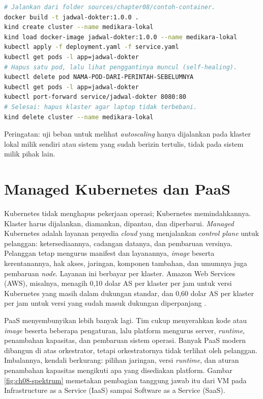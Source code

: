 \begin{pendalaman}[title={Pendalaman Teknis (opsional): Menjalankan Layanan di Klaster Lokal}]
\begin{lstlisting}[language=bash, caption={Menjalankan layanan jadwal dokter di klaster kind,
tersedia di \berkas{sources/chapter08/README.md}}, label={lst:ch08-perintah-kind}]
# Jalankan dari folder sources/chapter08/contoh-container.
docker build -t jadwal-dokter:1.0.0 .
kind create cluster --name medikara-lokal
kind load docker-image jadwal-dokter:1.0.0 --name medikara-lokal
kubectl apply -f deployment.yaml -f service.yaml
kubectl get pods -l app=jadwal-dokter
# Hapus satu pod, lalu lihat penggantinya muncul (self-healing).
kubectl delete pod NAMA-POD-DARI-PERINTAH-SEBELUMNYA
kubectl get pods -l app=jadwal-dokter
kubectl port-forward service/jadwal-dokter 8080:80
# Selesai: hapus klaster agar laptop tidak terbebani.
kind delete cluster --name medikara-lokal
\end{lstlisting}

  Peringatan: uji beban untuk melihat \textit{autoscaling} hanya dijalankan pada klaster lokal
  milik sendiri atau sistem yang sudah berizin tertulis, tidak pada sistem milik pihak lain.
\end{pendalaman}

\section{Managed Kubernetes dan PaaS}
\label{sec:ch08-managed-paas}

Kubernetes tidak menghapus pekerjaan operasi; Kubernetes memindahkannya. Klaster harus dijalankan,
diamankan, dipantau, dan diperbarui. \textit{Managed} Kubernetes adalah layanan penyedia
\textit{cloud} yang menjalankan \textit{control plane} untuk pelanggan: ketersediaannya, cadangan
datanya, dan pembaruan versinya. Pelanggan tetap mengurus manifest dan layanannya, \textit{image}
beserta kerentanannya, hak akses, jaringan, komponen tambahan, dan umumnya juga pembaruan
\textit{node}. Layanan ini berbayar per klaster. Amazon Web Services (AWS), misalnya, menagih 0,10
dolar AS per klaster per jam untuk versi Kubernetes yang masih dalam dukungan standar, dan 0,60
dolar AS per klaster per jam untuk versi yang sudah masuk dukungan diperpanjang
\cite{c08-eks-pricing}.

PaaS menyembunyikan lebih banyak lagi. Tim cukup menyerahkan kode atau \textit{image} beserta
beberapa pengaturan, lalu platform mengurus server, \textit{runtime}, penambahan kapasitas, dan
pembaruan sistem operasi. Banyak PaaS modern dibangun di atas orkestrator, tetapi orkestratornya
tidak terlihat oleh pelanggan. Imbalannya, kendali berkurang: pilihan jaringan, versi
\textit{runtime}, dan aturan penambahan kapasitas mengikuti apa yang disediakan platform. Gambar
\ref{fig:ch08-spektrum} memetakan pembagian tanggung jawab itu dari VM pada Infrastructure as a
Service (IaaS) sampai Software as a Service (SaaS).

